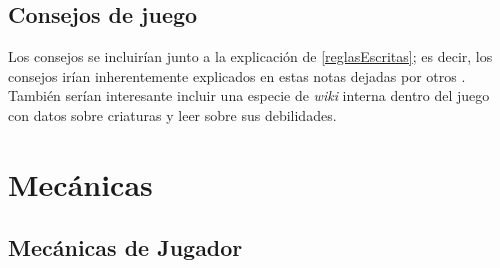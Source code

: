 \begin{multicols}{2}
    \subsection{Consejos de juego}
    Los consejos se incluirían junto a la explicación de \ref{reglasEscritas}; es decir, los consejos irían inherentemente explicados en estas notas dejadas por otros \hunters. También serían interesante incluir una especie de \textit{wiki} interna dentro del juego con datos sobre criaturas y leer sobre sus debilidades.
    \end{multicols}

\newpage


\section{Mecánicas}

    \subsection{Mecánicas de Jugador}\label{mecanicasJugador}
